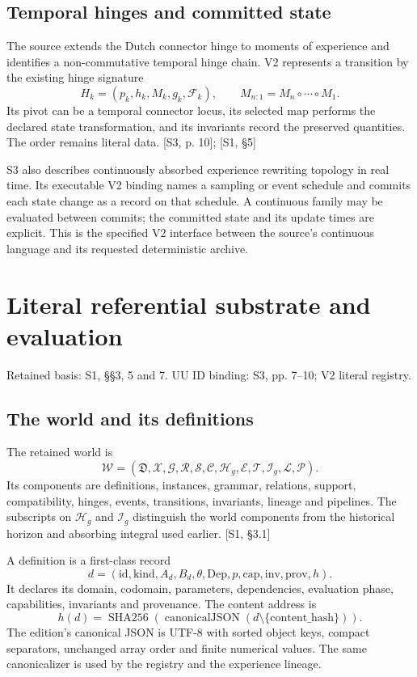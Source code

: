 \documentclass[11pt,a4paper]{article}
\numberwithin{equation}{section}
\newcommand{\newsec}[1]{\clearpage\section{#1}}
\newcommand{\src}[2]{{\sffamily\small\color{slate}[#1, #2]}}
\newcommand{\origin}[1]{{\sffamily\small\color{slate}#1}\par\vspace{3pt}}
\begin{document}
\subsection{Temporal hinges and committed state}
The source extends the Dutch connector hinge to moments of experience and identifies a non-commutative temporal hinge chain. V2 represents a transition by the existing hinge signature
\begin{equation}
H_k=(p_k,h_k,M_k,g_k,\mathcal F_k),
\qquad M_{n:1}=M_n\circ\cdots\circ M_1.
\end{equation}
Its pivot can be a temporal connector locus, its selected map performs the declared state transformation, and its invariants record the preserved quantities. The order remains literal data. \src{S3}{p. 10}; \src{S1}{\S5}

S3 also describes continuously absorbed experience rewriting topology in real time. Its executable V2 binding names a sampling or event schedule and commits each state change as a record on that schedule. A continuous family may be evaluated between commits; the committed state and its update times are explicit. This is the specified V2 interface between the source's continuous language and its requested deterministic archive.

\newsec{Literal referential substrate and evaluation}
\label{sec:registry}
\origin{Retained basis: S1, §§3, 5 and 7. UU ID binding: S3, pp. 7--10; V2 literal registry.}

\subsection{The world and its definitions}
The retained world is
\begin{equation}
\mathcal W=(\mathfrak D,\mathcal X,\mathcal G,\mathcal R,\mathcal S,\mathcal C,
\mathcal H_g,\mathcal E,\mathcal T,\mathcal I_g,\mathcal L,\mathcal P).
\end{equation}
Its components are definitions, instances, grammar, relations, support, compatibility, hinges, events, transitions, invariants, lineage and pipelines. The subscripts on $\mathcal H_g$ and $\mathcal I_g$ distinguish the world components from the historical horizon and absorbing integral used earlier. \src{S1}{\S3.1}

A definition is a first-class record
\begin{equation}
d=(\mathrm{id},\mathrm{kind},A_d,B_d,\theta,\mathrm{Dep},p,
\mathrm{cap},\mathrm{inv},\mathrm{prov},h).
\end{equation}
It declares its domain, codomain, parameters, dependencies, evaluation phase, capabilities, invariants and provenance. The content address is
\begin{equation}
h(d)=\operatorname{SHA256}\left(\operatorname{canonicalJSON}
(d\setminus\{\mathrm{content\_hash}\})\right).
\end{equation}
The edition's canonical JSON is UTF-8 with sorted object keys, compact separators, unchanged array order and finite numerical values. The same canonicalizer is used by the registry and the experience lineage.
\end{document}
